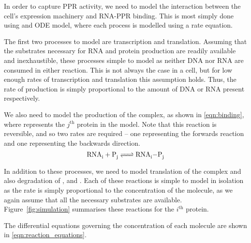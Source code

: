 In order to capture PPR activity, we need to model the interaction between the
cell's expression machinery and RNA-PPR binding.
This is most simply done using and ODE model, where each process is modelled
using a rate equation.

The first two processes to model are transcription and translation. 
Assuming that the substrates necessary for RNA and protein production are
readily available and inexhaustible, these processes simple to
model as neither DNA nor RNA are consumed in either reaction.
This is not always the case in a cell, but for low enough rates of
transcription and translation this assumption holds.
Thus, the rate of production is simply proportional to the amount of DNA or RNA
present respectively.

We also need to model the production of the  complex, as shown in
\ref{eqn:binding}, where  represents the $j^{\mathrm{th}}$ protein in 
the model.
Note that this reaction is reversible, and so two rates are required -- one
representing the forwards reaction and one representing the backwards
direction.
\begin{equation}
  \cee{ RNA_i + P_j <=> RNA_i-P_j }
  \label{eqn:binding}
\end{equation}

In addition to these processes, we need to model translation of the
 complex and also degradation of ,  and .
Each of these reactions is simple to model in isolation as the rate is simply
proportional to the concentration of the molecule, as we again assume that all
the necessary substrates are available.
Figure~\ref{fig:simulation} summarises these reactions for the $i^\mathrm{th}$
protein.

The differential equations governing the concentration of each molecule are 
shown in \ref{eqn:reaction_equations}.

